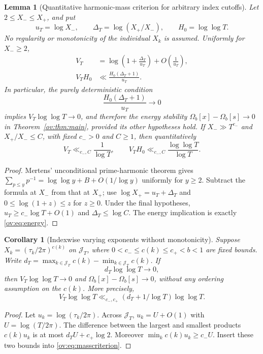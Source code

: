 \documentclass[11pt,reqno]{amsart}
\numberwithin{equation}{section}
\newtheorem{lemma}[theorem]{Lemma}
\newtheorem{corollary}[theorem]{Corollary}
\begin{document}
\begin{lemma}[Quantitative harmonic-mass criterion for arbitrary index cutoffs]
\label{ov:lem:masscriterion}
Let $2\le X_-\le X_+$, and put
\[
  u_T=\log X_-,\qquad
  \Delta_T=\log(X_+/X_-),\qquad
  H_0=\log\log T.
\]
No regularity or monotonicity of the individual $X_k$ is assumed.
Uniformly for $X_-\ge2$,
\begin{equation}
\begin{split}
 V_T
 &=\log\left(1+\frac{\Delta_T}{u_T}\right)
       +O\left(\frac1{u_T}\right),\\
 V_TH_0&\ll\frac{H_0(\Delta_T+1)}{u_T}.
\end{split}
\label{ov:eq:masscriterion}
\end{equation}
In particular, the purely deterministic condition
\begin{equation}
 \frac{H_0(\Delta_T+1)}{u_T}\longrightarrow0
 \label{ov:eq:masssuff}
\end{equation}
implies $V_T\log\log T\to0$, and therefore the energy
stability $\Omega_b[x]-\Omega_b[s]\to0$ in
Theorem~\ref{ov:thm:main}, provided its other hypotheses hold.
If $X_-\gg T^{c_-}$ and $X_+/X_-\le C$, with fixed
$c_->0$ and $C\ge1$, then quantitatively
\begin{equation}
 V_T\ll_{c_-,C}\frac1{\log T},\qquad
 V_TH_0\ll_{c_-,C}\frac{\log\log T}{\log T}.
 \label{ov:eq:massstrong}
\end{equation}
\end{lemma}
\begin{proof}
Mertens' unconditional prime-harmonic theorem gives
$\sum_{p\le y}p^{-1}=\log\log y+B+O(1/\log y)$ uniformly for
$y\ge2$. Subtract the formula at $X_-$ from that at $X_+$;
use $\log X_+=u_T+\Delta_T$ and
$0\le\log(1+z)\le z$ for $z\ge0$. Under the final hypotheses,
$u_T\ge c_-\log T+O(1)$ and $\Delta_T\le\log C$.
The energy implication is exactly \eqref{ov:eq:energy}.
\end{proof}

\begin{corollary}[Indexwise varying exponents without monotonicity]
\label{ov:cor:generalvary}
Suppose $X_k=(\tau_k/2\pi)^{c(k)}$ on $\mathcal J_T$,
where $0<c_-\le c(k)\le c_+<b<1$ are fixed bounds.
Write $d_T=\max_{k\in\mathcal J_T}c(k)
 -\min_{k\in\mathcal J_T}c(k)$. If
\begin{equation}
  d_T\log\log T\longrightarrow0,
  \label{ov:eq:osccondition}
\end{equation}
then $V_T\log\log T\to0$ and
$\Omega_b[x]-\Omega_b[s]\to0$, without any ordering assumption
on the $c(k)$. More precisely,
\begin{equation}
 V_T\log\log T
 \ll_{c_-,c_+} (d_T+1/\log T)\log\log T.
 \label{ov:eq:oscrate}
\end{equation}
\end{corollary}
\begin{proof}
Let $u_k=\log(\tau_k/2\pi)$. Across $\mathcal J_T$,
$u_k=U+O(1)$ with $U=\log(T/2\pi)$.
The difference between the largest and smallest products
$c(k)u_k$ is at most $d_TU+c_+\log 2$.
Moreover $\min_k c(k)u_k\ge c_-U$.
Insert these two bounds into \eqref{ov:eq:masscriterion}.
\end{proof}
\end{document}
